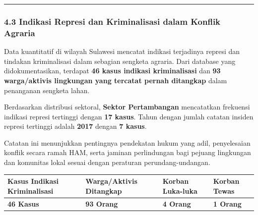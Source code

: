 \documentclass[
]{article}
\newcounter{none} %
\begin{document}
\begin{center}\rule{0.5\linewidth}{0.5pt}\end{center}

\subsubsection{4.3 Indikasi Represi dan Kriminalisasi dalam Konflik
Agraria}\label{indikasi-represi-dan-kriminalisasi-dalam-konflik-agraria}

Data kuantitatif di wilayah Sulawesi mencatat indikasi terjadinya
represi dan tindakan kriminalisasi dalam sebagian sengketa agraria. Dari
database yang didokumentasikan, terdapat \textbf{46 kasus indikasi
kriminalisasi} dan \textbf{93 warga/aktivis lingkungan yang tercatat
pernah ditangkap} dalam penanganan sengketa lahan.

Berdasarkan distribusi sektoral, \textbf{Sektor Pertambangan}
mencatatkan frekuensi indikasi represi tertinggi dengan \textbf{17
kasus}. Tahun dengan jumlah catatan insiden represi tertinggi adalah
\textbf{2017} dengan \textbf{7 kasus}.

Catatan ini menunjukkan pentingnya pendekatan hukum yang adil,
penyelesaian konflik secara ramah HAM, serta jaminan perlindungan bagi
pejuang lingkungan dan komunitas lokal sesuai dengan peraturan
perundang-undangan.

{\def\LTcaptype{none} %
\begin{longtable}[]{@{}
  >{\raggedright\arraybackslash}p{}
  >{\raggedright\arraybackslash}p{}
  >{\raggedright\arraybackslash}p{}
  >{\raggedright\arraybackslash}p{}@{}}
\toprule\noalign{}
\begin{minipage}[b]{\linewidth}\raggedright
Kasus Indikasi Kriminalisasi
\end{minipage} & \begin{minipage}[b]{\linewidth}\raggedright
Warga/Aktivis Ditangkap
\end{minipage} & \begin{minipage}[b]{\linewidth}\raggedright
Korban Luka-luka
\end{minipage} & \begin{minipage}[b]{\linewidth}\raggedright
Korban Tewas
\end{minipage} \\
\midrule\noalign{}
\endhead
\bottomrule\noalign{}
\endlastfoot
\textbf{46 Kasus} & \textbf{93 Orang} & \textbf{4 Orang} & \textbf{1
Orang} \\
\end{longtable}
}
\end{document}
